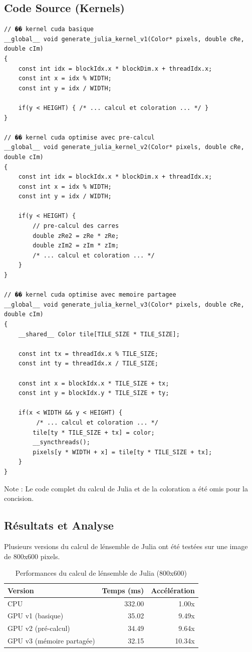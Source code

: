 \documentclass[a4paper,11pt]{article}
\begin{document}
\subsection{Code Source (Kernels)}
\begin{lstlisting}[caption=Kernels pour l\'ensemble de Julia (exercice6.cu - extraits)]
// �� kernel cuda basique
__global__ void generate_julia_kernel_v1(Color* pixels, double cRe, double cIm)
{
    const int idx = blockIdx.x * blockDim.x + threadIdx.x;
    const int x = idx % WIDTH;
    const int y = idx / WIDTH;
    
    if(y < HEIGHT) { /* ... calcul et coloration ... */ }
}

// �� kernel cuda optimise avec pre-calcul
__global__ void generate_julia_kernel_v2(Color* pixels, double cRe, double cIm)
{
    const int idx = blockIdx.x * blockDim.x + threadIdx.x;
    const int x = idx % WIDTH;
    const int y = idx / WIDTH;
    
    if(y < HEIGHT) {
        // pre-calcul des carres
        double zRe2 = zRe * zRe;
        double zIm2 = zIm * zIm;
        /* ... calcul et coloration ... */ 
    }
}

// �� kernel cuda optimise avec memoire partagee
__global__ void generate_julia_kernel_v3(Color* pixels, double cRe, double cIm)
{
    __shared__ Color tile[TILE_SIZE * TILE_SIZE];
    
    const int tx = threadIdx.x % TILE_SIZE;
    const int ty = threadIdx.x / TILE_SIZE;
    
    const int x = blockIdx.x * TILE_SIZE + tx;
    const int y = blockIdx.y * TILE_SIZE + ty;
    
    if(x < WIDTH && y < HEIGHT) {
         /* ... calcul et coloration ... */ 
        tile[ty * TILE_SIZE + tx] = color;
        __syncthreads();
        pixels[y * WIDTH + x] = tile[ty * TILE_SIZE + tx];
    }
}
\end{lstlisting}
Note : Le code complet du calcul de Julia et de la coloration a été omis pour la concision.

\subsection{Résultats et Analyse}
Plusieurs versions du calcul de l\'ensemble de Julia ont été testées sur une image de 800x600 pixels.

\begin{table}[H]
\centering
\begin{tabular}{@{}lrr@{}}
\toprule
\textbf{Version} & \textbf{Temps (ms)} & \textbf{Accélération} \\
\midrule
CPU & 332.00 & 1.00x \\
GPU v1 (basique) & 35.02 & 9.49x \\
GPU v2 (pré-calcul) & 34.49 & 9.64x \\
GPU v3 (mémoire partagée) & 32.15 & 10.34x \\
\bottomrule
\end{tabular}
\caption{Performances du calcul de l\'ensemble de Julia (800x600)}
\label{tab:julia_performance}
\end{table}
\end{document}
